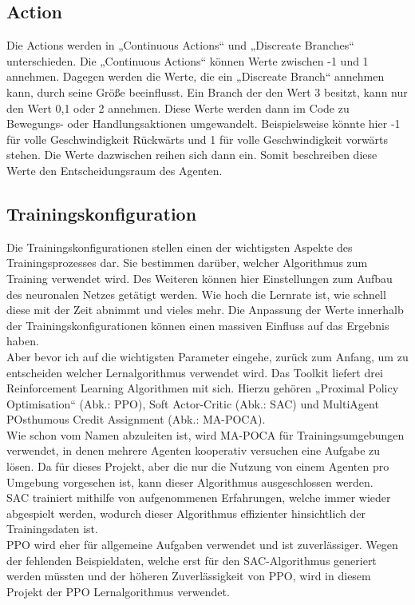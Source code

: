 \subsection{Action}
\label{action}
Die Actions werden in „Continuous Actions“ und „Discreate Branches“ unterschieden. Die „Continuous Actions“ können Werte zwischen -1 und 1 annehmen. Dagegen werden die Werte, die ein „Discreate Branch“ annehmen kann, durch seine Größe beeinflusst. Ein Branch der den Wert 3 besitzt, kann nur den Wert 0,1 oder 2 annehmen. Diese Werte werden dann im Code zu Bewegungs- oder Handlungsaktionen umgewandelt. Beispielsweise könnte hier -1 für volle Geschwindigkeit Rückwärts und 1 für volle Geschwindigkeit vorwärts stehen. Die Werte dazwischen reihen sich dann ein. Somit beschreiben diese Werte den Entscheidungsraum des Agenten. 

\subsection{Trainingskonfiguration}
Die Trainingskonfigurationen stellen einen der wichtigsten Aspekte des Trainingsprozesses dar. Sie bestimmen darüber, welcher Algorithmus zum Training verwendet wird. Des Weiteren können hier Einstellungen zum Aufbau des neuronalen Netzes getätigt werden. Wie hoch die Lernrate ist, wie schnell diese mit der Zeit abnimmt und vieles mehr. Die Anpassung der Werte innerhalb der Trainingskonfigurationen können einen massiven Einfluss auf das Ergebnis haben. 
\\
Aber bevor ich auf die wichtigsten Parameter eingehe, zurück zum Anfang, um zu entscheiden welcher Lernalgorithmus verwendet wird. Das Toolkit liefert drei Reinforcement Learning Algorithmen mit sich. Hierzu gehören „Proximal Policy Optimisation“ (Abk.: PPO), Soft Actor-Critic (Abk.: SAC) und MultiAgent POsthumous Credit Assignment (Abk.: MA-POCA). 
\\
Wie schon vom Namen abzuleiten ist, wird MA-POCA für Trainingsumgebungen verwendet, in denen mehrere Agenten kooperativ versuchen eine Aufgabe zu lösen. Da für dieses Projekt, aber die nur die Nutzung von einem Agenten pro Umgebung vorgesehen ist, kann dieser Algorithmus ausgeschlossen werden.\cite{mapoca}
\\
SAC trainiert mithilfe von aufgenommenen Erfahrungen, welche immer wieder abgespielt werden, wodurch dieser Algorithmus effizienter hinsichtlich der Trainingsdaten ist.\cite{sac}
\\
PPO wird eher für allgemeine Aufgaben verwendet und ist zuverlässiger.\cite{mapoca} Wegen der fehlenden Beispieldaten, welche erst für den SAC-Algorithmus generiert werden müssten und der höheren Zuverlässigkeit von PPO, wird in diesem Projekt der PPO Lernalgorithmus verwendet.
